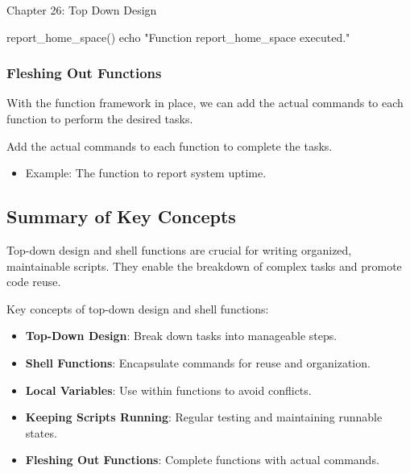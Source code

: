 \begin{notes}{Chapter 26: Top Down Design}
\begin{highlight}
\begin{itemize}
\begin{code}[Shell]
    report_home_space() {
        echo "Function report_home_space executed."
    }
    \end{code}
    \end{itemize}
    
    \end{highlight}
    
    \subsubsection*{Fleshing Out Functions}
    
    With the function framework in place, we can add the actual commands to each function to perform the desired tasks.
    
    \begin{highlight}
    
    Add the actual commands to each function to complete the tasks.
    
    \begin{itemize}
        \item Example: The function to report system uptime.
    \end{itemize}
    
    \end{highlight}
    
    \subsection*{Summary of Key Concepts}
    
    Top-down design and shell functions are crucial for writing organized, maintainable scripts. They enable the breakdown of complex tasks and promote code reuse.
    
    \begin{highlight}
    
    Key concepts of top-down design and shell functions:
    
    \begin{itemize}
        \item \textbf{Top-Down Design}: Break down tasks into manageable steps.
        \item \textbf{Shell Functions}: Encapsulate commands for reuse and organization.
        \item \textbf{Local Variables}: Use within functions to avoid conflicts.
        \item \textbf{Keeping Scripts Running}: Regular testing and maintaining runnable states.
        \item \textbf{Fleshing Out Functions}: Complete functions with actual commands.
    \end{itemize}
    

\end{highlight}
\end{notes}
